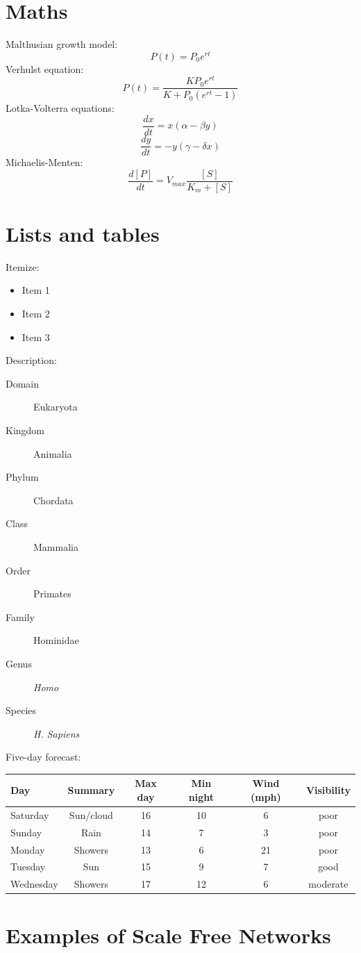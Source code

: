 \documentclass[a0,final]{a0poster}
\begin{document}
\begin{multicols}{3}
\section*{Maths}
Malthusian growth model:
$$P(t) = P_0 e^{rt}$$
Verhulst equation:
$$P(t) = \frac{K P_0 e^{rt}}{K + P_0 (e^{rt} - 1)}$$
Lotka-Volterra equations:
$$\frac{dx}{dt} = x(\alpha - \beta y)$$
$$\frac{dy}{dt} = - y(\gamma - \delta x)$$
Michaelis-Menten:
$$\frac{d[P]}{dt} = V_{max} \frac{[S]}{K_m + [S]}$$


\section*{Lists and tables}
Itemize:
\begin{itemize}
\item Item 1
\item Item 2
\item Item 3
\end{itemize}
\null
Description:
\begin{description}
\item[Domain] Eukaryota
\item[Kingdom] Animalia
\item[Phylum] Chordata
\item[Class] Mammalia
\item[Order] Primates
\item[Family] Hominidae
\item[Genus] \emph{Homo}
\item[Species] \emph{H. Sapiens}
\end{description}
\null
Five-day forecast:
\begin{center}
\begin{tabular}{lccccc}
Day & Summary & Max day & Min night & Wind (mph) & Visibility\\
\hline
Saturday & Sun/cloud & 16 & 10 & 6 & poor\\
Sunday & Rain & 14 & 7 & 3 & poor\\
Monday & Showers & 13 & 6 & 21 & poor\\
Tuesday & Sun & 15 & 9 & 7 & good\\
Wednesday & Showers & 17 & 12 & 6 &moderate
\end{tabular}
\end{center}


\columnbreak

\section*{Examples of Scale Free Networks}


\end{multicols}
\end{document}
